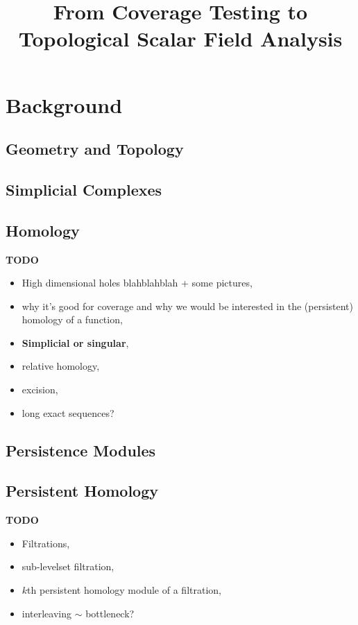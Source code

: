 \documentclass[12pt]{article}
\begin{document}
\title{From Coverage Testing to Topological Scalar Field Analysis}
\maketitle



\section{Background}

\subsection{Geometry and Topology}
  

\subsection{Simplicial Complexes}\label{sec:complexes}
  


\subsection{Homology}\label{sec:homology}
  \textbf{TODO}
  \begin{itemize}
    \item High dimensional holes blahblahblah + some pictures,
    \item why it's good for coverage and why we would be interested in the (persistent) homology of a function,
    \item \textbf{Simplicial or singular},
    \item relative homology,
    \item excision,
    \item long exact sequences?
  \end{itemize}

\subsection{Persistence Modules}
  

\subsection{Persistent Homology}
  \textbf{TODO}
  \begin{itemize}
    \item Filtrations,
    \item sub-levelset filtration,
    \item $k$th persistent homology module of a filtration,
    \item interleaving $\sim$ bottleneck?
  \end{itemize}
\end{document}
